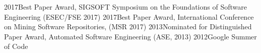 
\begin{cvawards}
\cvaward
{2017}{Best Paper Award, SIGSOFT Symposium on the Foundations of Software Engineering (ESEC/FSE 2017)}
\cvaward
{2017}{Best Paper Award, International Conference on Mining Software Repositories, (MSR 2017)}
\cvaward
{2013}{Nominated for Distinguished Paper Award, Automated Software Engineering (ASE, 2013)}
\cvaward
{2012}{Google Summer of Code}
\end{cvawards}